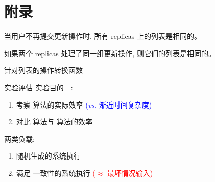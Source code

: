 
\section{附录}

\appendix


\begin{frame}{}
  \begin{cdef}
    当用户不再提交更新操作时, 所有 replicas 上的列表是相同的。
  \end{cdef}

  \pause
  \vspace{0.50cm}

  \begin{cdef}
    如果两个 replicas 处理了同一组更新操作, 则它们的列表是相同的。
  \end{cdef}

  \pause
  \vspace{0.60cm}
  \centerline{}
\end{frame}

\begin{frame}{}
  \centerline{\large 针对列表的操作转换函数~}

  \resizebox{\textwidth}{!}{
    \begin{minipage}{\textwidth}
      
    \end{minipage}
  }
\end{frame}

\begin{frame}{实验评估}
  实验目的~\footnotemark[1]~:
  \begin{enumerate}
    \item 考察 \readcentric{} 算法的实际效率 
      \textcolor{blue}{\small ({\it vs.} 渐近时间复杂度)}
    \item 对比 \readcentric{} 算法与 \rwclosure{} 算法的效率
  \end{enumerate}

  \pause
  \vspace{0.50cm}

  两类负载:
  \begin{enumerate}
    \item 随机生成的系统执行
    \item 满足 \PRAM{} 一致性的系统执行 \textcolor{red}{\small ($\approx$ 最坏情况输入)}
  \end{enumerate}
\end{frame}

